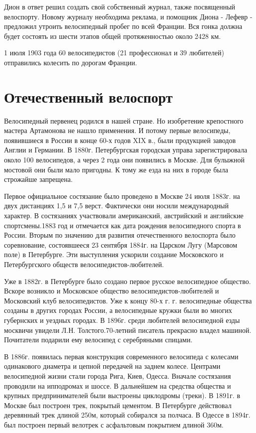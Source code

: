 \documentclass[a4paper,14pt]{extreport}
\begin{document}
Дион в ответ решил создать свой собственный журнал, также посвященный велоспорту. Новому журналу необходима реклама, и помощник Диона - Лефевр - предложил утроить велосипедный пробег по всей Франции. Вся гонка должна будет состоять из шести этапов общей протяженностью около 2428 км.

1 июля 1903 года 60 велосипедистов (21 профессионал и 39 любителей) отправились колесить по дорогам Франции.

\chapter{Отечественный велоспорт}
Велосипедный первенец родился в нашей стране. Но изобретение крепостного мастера Артамонова не нашло применения. И потому первые велосипеды, появившиеся в России в конце 60-х годов XIX в., были продукцией заводов Англии и Германии. В 1880г. Петербургская городская управа зарегистрировала около 100 велосипедов, а через 2 года они появились в Москве. Для булыжной мостовой они были мало пригодны. К тому же езда на них в городе была строжайше запрещена.

Первое официальное состязание было проведено в Москве 24 июля 1883г. на двух дистанциях 1,5 и 7,5 верст. Фактически они носили международный характер. В состязаниях участвовали американский, австрийский и английские спортсмены.1883 год и отмечается как дата рождения велосипедного спорта в России. Вторым по значению для развития отечественного велоспорта было соревнование, состоявшееся 23 сентября 1884г. на Царском Лугу (Марсовом поле) в Петербурге. Эти выступления ускорили создание Московского и Петербургского обществ велосипедистов-любителей.

Уже в 1882г. в Петербурге было создано первое русское велосипедное общество. Вскоре возникло и Московское общество велосипедистов-любителей и Московский клуб велосипедистов. Уже к концу 80-х г. г. велосипедные общества созданы в других городах России, а велосипедные кружки были во многих губернских и уездных городах. В 1896г. среди любителей велосипедной езды москвичи увидели Л.Н. Толстого.70-летний писатель прекрасно владел машиной. Почитатели подарили ему велосипед с серебряными спицами.

В 1886г. появилась первая конструкция современного велосипеда с колесами одинакового диаметра и цепной передачей на заднем колесе. Центрами велосипедной жизни стали города Рига, Киев, Одесса. Вначале состязания проводили на ипподромах и шоссе. В дальнейшем на средства общества и крупных предпринимателей были выстроены циклодромы (треки). В 1891г. в Москве был построен трек, покрытый цементом. В Петербурге действовал деревянный трек длиной 250м, который собирался за полчаса. В Одессе в 1894г. был построен первый велотрек с асфальтовым покрытием длиной 360м.
\end{document}
